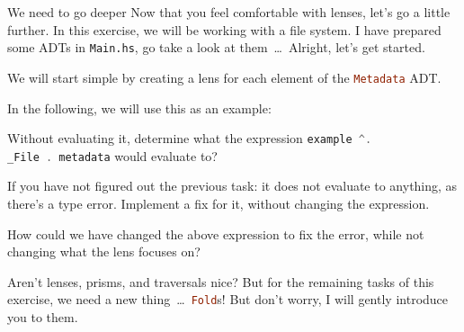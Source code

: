 \documentclass{exercise}
\newcommand\h[2][]{\lstinline[language=haskell,#1]{#2}}
\begin{document}
	\begin{exercise}{We need to go deeper}
		Now that you feel comfortable with lenses, let's go a little further. In this
		exercise, we will be working with a file system. I have prepared some ADTs in
		\texttt{Main.hs}, go take a look at them~\ldots~Alright, let's get started.
		\begin{tasks}
			\item We will start simple by creating a lens for each element of the
				\h{Metadata} ADT.
		\end{tasks}
		In the following, we will use this as an example:
		\begin{tasks}[resume*]
			\item Without evaluating it, determine what the expression \h{example ^.
				_File . metadata} would evaluate to?
			\item If you have not figured out the previous task: it does not evaluate to
				anything, as there's a type error. Implement a fix for it, without
				changing the expression.
			\item How could we have changed the above expression to fix the error, while
				not changing what the lens focuses on?
		\end{tasks}
		Aren't lenses, prisms, and traversals nice? But for the remaining tasks of this
		exercise, we need a new thing~\ldots~\h{Fold}s! But don't worry, I will gently
		introduce you to them.


\end{exercise}
\end{document}
